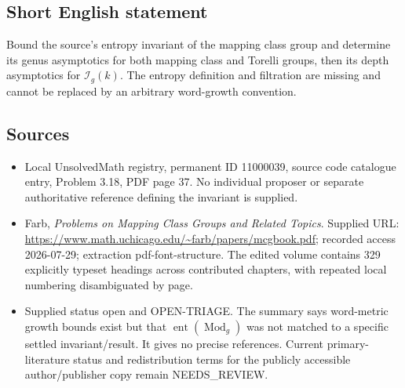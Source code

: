 \documentclass[11pt]{article}
\begin{document}
\subsection{Short English statement}
Bound the source's entropy invariant of the mapping class group and determine its genus asymptotics for both mapping class and Torelli groups, then its depth asymptotics for \(\mathcal I_g(k)\). The entropy definition and filtration are missing and cannot be replaced by an arbitrary word-growth convention.
\subsection{Sources}
\begin{itemize}
\item Local UnsolvedMath registry, permanent ID 11000039, source code catalogue entry, Problem 3.18, PDF page 37. No individual proposer or separate authoritative reference defining the invariant is supplied.
\item Farb, \emph{Problems on Mapping Class Groups and Related Topics}. Supplied URL: \url{https://www.math.uchicago.edu/~farb/papers/mcgbook.pdf}; recorded access 2026-07-29; extraction pdf-font-structure. The edited volume contains 329 explicitly typeset headings across contributed chapters, with repeated local numbering disambiguated by page.
\item Supplied status open and OPEN-TRIAGE. The summary says word-metric growth bounds exist but that \(\operatorname{ent}(\operatorname{Mod}_g)\) was not matched to a specific settled invariant/result. It gives no precise references. Current primary-literature status and redistribution terms for the publicly accessible author/publisher copy remain NEEDS\_REVIEW.
\end{itemize}
\end{document}
